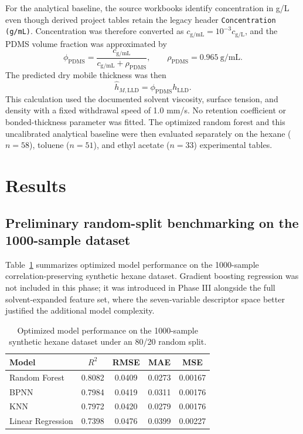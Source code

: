 \documentclass[11pt]{article}
\begin{document}
For the analytical baseline, the source workbooks identify concentration in g/L even though derived project tables retain the legacy header \texttt{Concentration (g/mL)}. Concentration was therefore converted as $c_{\mathrm{g/mL}}=10^{-3}c_{\mathrm{g/L}}$, and the PDMS volume fraction was approximated by
\begin{equation}
\phi_{\mathrm{PDMS}}=\frac{c_{\mathrm{g/mL}}}{c_{\mathrm{g/mL}}+\rho_{\mathrm{PDMS}}},
\qquad \rho_{\mathrm{PDMS}}=0.965\ \mathrm{g/mL}.
\end{equation}
The predicted dry mobile thickness was then
\begin{equation}
\hat{h}_{M,\mathrm{LLD}}=\phi_{\mathrm{PDMS}}h_{\mathrm{LLD}}.
\end{equation}
This calculation used the documented solvent viscosity, surface tension, and density with a fixed withdrawal speed of 1.0 mm/s. No retention coefficient or bonded-thickness parameter was fitted. The optimized random forest and this uncalibrated analytical baseline were then evaluated separately on the hexane ($n=58$), toluene ($n=51$), and ethyl acetate ($n=33$) experimental tables.

\section{Results}

\subsection{Preliminary random-split benchmarking on the 1000-sample dataset}
Table~\ref{tab:phase1} summarizes optimized model performance on the 1000-sample correlation-preserving synthetic hexane dataset. Gradient boosting regression was not included in this phase; it was introduced in Phase III alongside the full solvent-expanded feature set, where the seven-variable descriptor space better justified the additional model complexity.

\begin{table}[H]
\centering
\caption{Optimized model performance on the 1000-sample synthetic hexane dataset under an 80/20 random split.}
\label{tab:phase1}
\begin{tabular}{lcccc}
\toprule
Model & $R^2$ & RMSE & MAE & MSE \\
\midrule
Random Forest & 0.8082 & 0.0409 & 0.0273 & 0.00167 \\
BPNN & 0.7984 & 0.0419 & 0.0311 & 0.00176 \\
KNN & 0.7972 & 0.0420 & 0.0279 & 0.00176 \\
Linear Regression & 0.7398 & 0.0476 & 0.0399 & 0.00227 \\
\bottomrule
\end{tabular}
\end{table}
\end{document}
